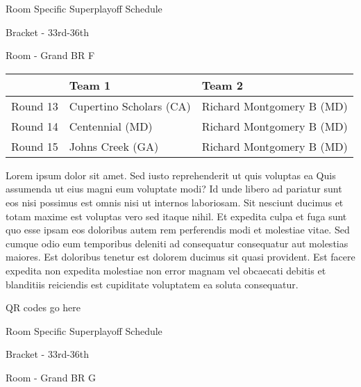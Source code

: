 \documentclass{article}%
\begin{document}
\newpage%
\begin{center}%
\begin{Huge}%
Room Specific Superplayoff Schedule%
\end{Huge}%
\vspace*{8pt}%
\linebreak%
\begin{Large}%
Bracket {-} 33rd{-}36th%
\end{Large}%
\vspace*{8pt}%
\linebreak%
\vspace*{8pt}%
\begin{Large}%
Room {-} Grand BR F%
\end{Large}%
\end{center}%
%
\begin{tabularx}{\textwidth}{|c|Y|Y|}%
\hline%
&Team 1&Team 2\\%
\hline%
Round 13&Cupertino Scholars (CA)&Richard Montgomery B (MD)\\%
Round 14&Centennial (MD)&Richard Montgomery B (MD)\\%
Round 15&Johns Creek (GA)&Richard Montgomery B (MD)\\%
\hline%
\end{tabularx}%
\vspace*{8pt}%
\newline%
Lorem ipsum dolor sit amet. Sed iusto reprehenderit ut quis voluptas ea Quis assumenda ut eius magni eum voluptate modi? Id unde libero ad pariatur sunt eos nisi possimus est omnis nisi ut internos laboriosam. Sit nesciunt ducimus et totam maxime est voluptas vero sed itaque nihil. Et expedita culpa et fuga sunt quo esse ipsam eos doloribus autem rem perferendis modi et molestiae vitae.\newline%
\newline%
Sed cumque odio eum temporibus deleniti ad consequatur consequatur aut molestias maiores. Est doloribus tenetur est dolorem ducimus sit quasi provident. Est facere expedita non expedita molestiae non error magnam vel obcaecati debitis et blanditiis reiciendis est cupiditate voluptatem ea soluta consequatur.%
\vspace*{140pt}%
\begin{center}%
\begin{Huge}%
QR codes go here%
\end{Huge}%
\end{center}%
\newpage%
\begin{center}%
\begin{Huge}%
Room Specific Superplayoff Schedule%
\end{Huge}%
\vspace*{8pt}%
\linebreak%
\begin{Large}%
Bracket {-} 33rd{-}36th%
\end{Large}%
\vspace*{8pt}%
\linebreak%
\vspace*{8pt}%
\begin{Large}%
Room {-} Grand BR G%
\end{Large}%
\end{center}%
\end{document}
